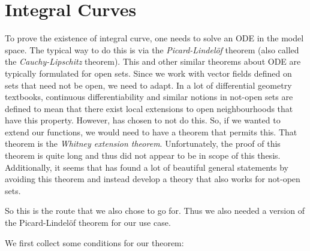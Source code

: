 \section{Integral Curves}

To prove the existence of integral curve, one needs to solve an ODE in the model space.
The typical way to do this is via the \emph{Picard-Lindelöf} theorem (also called the \emph{Cauchy-Lipschitz} theorem). 
This and other similar theorems about ODE are typically formulated for open sets. 
Since we work with vector fields defined on sets that need not be open, we need to adapt. 
In a lot of differential geometry textbooks, continuous differentiability and similar notions in not-open sets are defined to mean that there exist local extensions to open neighbourhoods that have this property. 
However, \mathlib has chosen to not do this. 
So, if we wanted to extend our functions, we would need to have a theorem that permits this. That theorem is the \emph{Whitney extension theorem}. 
Unfortunately, the proof of this theorem is quite long and thus did not appear to be in scope of this thesis. 
Additionally, it seems that \mathlib has found a lot of beautiful general statements by avoiding this theorem and instead develop a theory that also works for not-open sets.

So this is the route that we also chose to go for. 
Thus we also needed a version of the Picard-Lindelöf theorem for our use case. 


We first collect some conditions for our theorem: 

